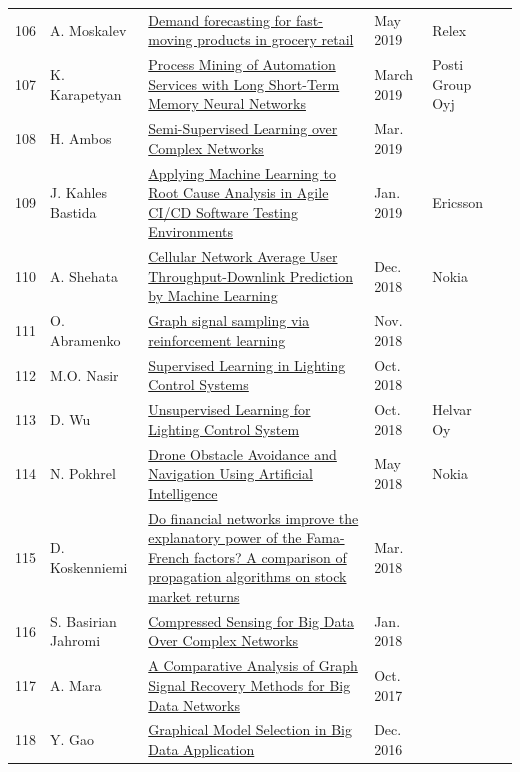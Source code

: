 \documentclass[11pt,a4paper]{article}
\begin{document}
\begin{longtable}{@{}r p{2.8cm} p{6.3cm} p{1.6cm} p{2cm} p{1.8cm}@{}}
106 & A. Moskalev & \href{https://aaltodoc.aalto.fi/handle/123456789/37915}{Demand forecasting for fast-moving products in grocery retail} & May 2019 & Relex &  \\
107 & K. Karapetyan & \href{https://aaltodoc.aalto.fi/handle/123456789/37178}{Process Mining of Automation Services with Long Short-Term Memory Neural Networks} & March 2019 & Posti Group Oyj &  \\
108 & H. Ambos & \href{https://aaltodoc.aalto.fi/handle/123456789/37130}{Semi-Supervised Learning over Complex Networks} & Mar. 2019 &  &  \\
109 & J. Kahles Bastida & \href{https://aaltodoc.aalto.fi/handle/123456789/36347}{Applying Machine Learning to Root Cause Analysis in Agile CI/CD Software Testing Environments} & Jan. 2019 & Ericsson &  \\
110 & A. Shehata & \href{https://aaltodoc.aalto.fi/handle/123456789/35471}{Cellular Network Average User Throughput-Downlink Prediction by Machine Learning} & Dec. 2018 & Nokia &  \\
111 & O. Abramenko & \href{https://aaltodoc.aalto.fi/handle/123456789/34750}{Graph signal sampling via reinforcement learning} & Nov. 2018 &  &  \\
112 & M.O. Nasir & \href{https://aaltodoc.aalto.fi/handle/123456789/34394}{Supervised Learning in Lighting Control Systems} & Oct. 2018 &  &  \\
113 & D. Wu & \href{https://aaltodoc.aalto.fi/handle/123456789/34384}{Unsupervised Learning for Lighting Control System} & Oct. 2018 & Helvar Oy &  \\
114 & N. Pokhrel & \href{https://aaltodoc.aalto.fi/handle/123456789/31561}{Drone Obstacle Avoidance and Navigation Using Artificial Intelligence} & May 2018 & Nokia &  \\
115 & D. Koskenniemi & \href{https://aaltodoc.aalto.fi/handle/123456789/30542}{Do financial networks improve the explanatory power of the Fama-French factors? A comparison of propagation algorithms on stock market returns} & Mar. 2018 &  &  \\
116 & S. Basirian Jahromi & \href{https://aaltodoc.aalto.fi/handle/123456789/29671}{Compressed Sensing for Big Data Over Complex Networks} & Jan. 2018 &  &  \\
117 & A. Mara & \href{https://aaltodoc.aalto.fi/handle/123456789/28567}{A Comparative Analysis of Graph Signal Recovery Methods for Big Data Networks} & Oct. 2017 &  &  \\
118 & Y. Gao & \href{https://aaltodoc.aalto.fi/handle/123456789/23908}{Graphical Model Selection in Big Data Application} & Dec. 2016 &  &  \\
\end{longtable}
\end{document}
